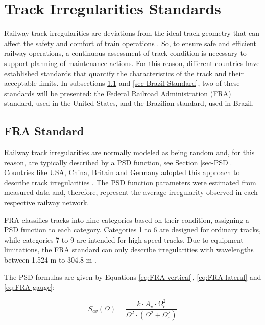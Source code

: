 \section{Track Irregularities Standards} \label{sec-track-defects}

Railway track irregularities are deviations from the ideal track geometry that can affect the safety and comfort of train operations \cite{Sansinena26032025}. So, to ensure safe and efficient railway operations, a continuous assessment of track condition is necessary to support planning of maintenance actions. For this reason, different countries have established standards that quantify the characteristics of the track and their acceptable limits. In subsections \ref{sec-FRA-Standard} and \ref{sec-Brazil-Standard}, two of these standards will be presented: the Federal Railroad Administration (FRA) standard, used in the United States, and the Brazilian standard, used in Brazil.

\subsection{FRA Standard} \label{sec-FRA-Standard}

Railway track irregularities are normally modeled as being random and, for this reason, are typically described by a PSD function, see Section \ref{sec-PSD}. Countries like USA, China, Britain and Germany adopted this approach to describe track irregularities \cite{PIRES2021107806,Berawi2013ImprovingRT}. The PSD function parameters were estimated from measured data and, therefore, represent the average irregularity observed in each respective railway network.

FRA classifies tracks into nine categories based on their condition, assigning a PSD function to each category. Categories 1 to 6 are designed for ordinary tracks, while categories 7 to 9 are intended for high-speed tracks. Due to equipment limitations, the FRA standard can only describe irregularities with wavelengths between 1.524 m to 304.8 m \cite{Berawi2013ImprovingRT}.

The PSD formulas are given by Equations \ref{eq:FRA-vertical}, \ref{eq:FRA-lateral} and \ref{eq:FRA-gauge}:

\begin{equation}
    S_{av}(\Omega) = \frac{k \cdot A_v \cdot \Omega_c^2}{\Omega^2 \cdot \left(\Omega^2 + \Omega_c^2\right)}
    \label{eq:FRA-vertical}
\end{equation}

